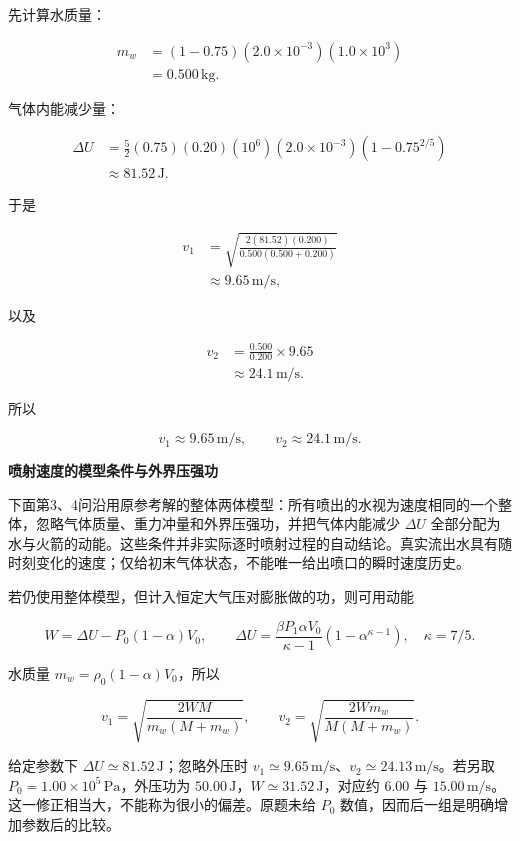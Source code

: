 \documentclass[12pt,a4paper,UTF8]{ctexart}
\begin{document}
先计算水质量：

\[
\begin{aligned}
m_w
&=(1-0.75)(2.0\times10^{-3})(1.0\times10^3)\\
&=0.500\,\mathrm{kg}.
\end{aligned}
\]

气体内能减少量：

\[
\begin{aligned}
\Delta U
&=\frac52(0.75)(0.20)(10^6)(2.0\times10^{-3})
\left(1-0.75^{2/5}\right)\\
&\approx81.52\,\mathrm J.
\end{aligned}
\]

于是

\[
\begin{aligned}
v_1
&=\sqrt{
\frac{2(81.52)(0.200)}
{0.500(0.500+0.200)}
}\\
&\approx9.65\,\mathrm{m/s},
\end{aligned}
\]

以及

\[
\begin{aligned}
v_2
&=\frac{0.500}{0.200}\times9.65\\
&\approx24.1\,\mathrm{m/s}.
\end{aligned}
\]

所以

\[
\boxed{v_1\approx9.65\,\mathrm{m/s}},
\qquad
\boxed{v_2\approx24.1\,\mathrm{m/s}}.
\tag{22}
\]

\textbf{喷射速度的模型条件与外界压强功}

下面第3、4问沿用原参考解的整体两体模型：所有喷出的水视为速度相同的一个整体，忽略气体质量、重力冲量和外界压强功，并把气体内能减少
\(\Delta U\)
全部分配为水与火箭的动能。这些条件并非实际逐时喷射过程的自动结论。真实流出水具有随时刻变化的速度；仅给初末气体状态，不能唯一给出喷口的瞬时速度历史。

若仍使用整体模型，但计入恒定大气压对膨胀做的功，则可用动能

\[W=\Delta U-P_0(1-\alpha)V_0,\qquad \Delta U=\frac{\beta P_1\alpha V_0}{\kappa-1}(1-\alpha^{\kappa-1}),\quad\kappa=7/5.\]

水质量 \(m_w=\rho_0(1-\alpha)V_0\)，所以

\[v_1=\sqrt{\frac{2WM}{m_w(M+m_w)}},\qquad v_2=\sqrt{\frac{2Wm_w}{M(M+m_w)}}.\]

给定参数下 \(\Delta U\simeq81.52\,\mathrm J\)；忽略外压时
\(v_1\simeq9.65\,\mathrm{m/s}\)、\(v_2\simeq24.13\,\mathrm{m/s}\)。若另取
\(P_0=1.00\times10^5\,\mathrm{Pa}\)，外压功为
\(50.00\,\mathrm J\)，\(W\simeq31.52\,\mathrm J\)，对应约 \(6.00\) 与
\(15.00\,\mathrm{m/s}\)。这一修正相当大，不能称为很小的偏差。原题未给
\(P_0\) 数值，因而后一组是明确增加参数后的比较。
\end{document}
